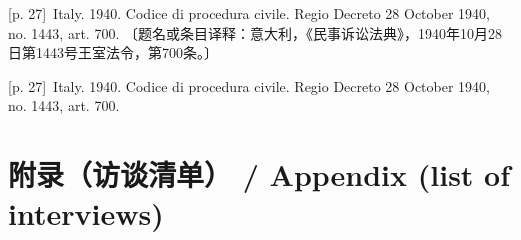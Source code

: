 \documentclass[10pt,a4paper]{article}
\begin{document}
\noindent\begin{minipage}{\textwidth}\begin{minipage}[t]{\dimexpr.5\textwidth-4mm\relax}{\scriptsize\color{gray} [p. 27]}\ Italy. 1940. Codice di procedura civile. Regio Decreto 28 October 1940, no. 1443, art. 700. 〔题名或条目译释：意大利，《民事诉讼法典》，1940年10月28日第1443号王室法令，第700条。〕\par\end{minipage}\hfill\begin{minipage}[t]{\dimexpr.5\textwidth-4mm\relax}{\scriptsize\color{gray} [p. 27]}\ Italy. 1940. Codice di procedura civile. Regio Decreto 28 October 1940, no. 1443, art. 700.\par\end{minipage}\end{minipage}\par
{}\section*{附录（访谈清单） / Appendix (list of interviews)}
\end{document}
